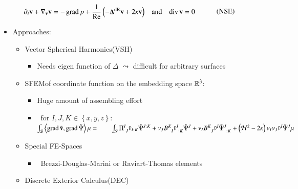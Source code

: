 \documentclass[15pt,t,aspectratio=1610]{beamer}
\begin{document}
  \begin{frame}
          \begin{align}
            \begin{aligned}
            \partial_{t}\mathbf{v} + \nabla_{\mathbf{v}} \mathbf{v} &= - \operatorname{grad} p + \frac{1}{\text{Re}} \left(- \boldsymbol{\Delta}^{\textup{dR}} \mathbf{v} + 2 \kappa \mathbf{v} \right)
              &\text{and}&&\operatorname{div}\mathbf{v} &= 0
              \end{aligned}\tag{NSE}
          \end{align}
    \begin{itemize}
      \item Approaches:
          \begin{itemize}
            \item Vector Spherical Harmonics\footnotemark[1] (VSH)
              \begin{itemize}
                \item Needs eigen function of \( \Delta \) \( \leadsto \) difficult for arbitrary surfaces
              \end{itemize}
            \item SFEM\footnotemark[1] of coordinate function on the embedding space \( \mathbb{R}^{3} \):
              \begin{itemize}
                \item Huge amount of assembling effort
                \item \eg\  for \( I,J,K\in\left\{ x,y,z \right\} \):\quad
                  \( \int_{\surf}\left\langle \Grad\tilde{\vb},  \Grad\tilde{\Psi} \right\rangle \mu 
                       = \quad \quad\int_{\surf} \tensor{\Pi}{^{I}_{J}}\tilde{v}_{I:K}\tilde{\Psi}^{J:K}
                             + \nu_{J}\tensor{B}{^{K}_{I}}\tensor{\tilde{v}}{^{I}_{:K}}\tilde{\Psi}^{J}
                             + \nu_{I}\tensor{B}{^{K}_{J}}\tilde{v}^{I}\tensor{\tilde{\Psi}}{^{J}_{:K}}
                             + \left( \mathcal{H}^{2} - 2\gaussianCurvature \right)\nu_{I}\nu_{J}\tilde{v}^{I}\tilde{\Psi}^{J} \mu\)
              \end{itemize}
            \item Special FE-Spaces
              \begin{itemize}
                \item \eg\ Brezzi-Douglas-Marini or Raviart-Thomas elements\footnotemark[2]
              \end{itemize}
            \item Discrete Exterior Calculus\footnotemark[1]\footnotemark[3] (DEC)
          \end{itemize}
    \end{itemize}
  \end{frame}
\end{document}
